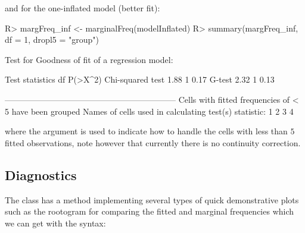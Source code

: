 \documentclass[
]{jss}
\newcommand{\1}{\mathcal{I}} \newcommand{\bZero}{\boldsymbol{0}}
\begin{document}
and for the one-inflated model (better fit):

\begin{CodeChunk}
\begin{CodeInput}
R> margFreq_inf <- marginalFreq(modelInflated)
R> summary(margFreq_inf, df = 1, dropl5 = "group")
\end{CodeInput}
\begin{CodeOutput}
Test for Goodness of fit of a regression model:

                 Test statistics df P(>X^2)
Chi-squared test            1.88  1    0.17
G-test                      2.32  1    0.13

-------------------------------------------------------------- 
Cells with fitted frequencies of < 5 have been grouped 
Names of cells used in calculating test(s) statistic: 1 2 3 4  
\end{CodeOutput}
\end{CodeChunk}

where the  argument is used to indicate how to handle the
cells with less than \(5\) fitted observations, note however that
currently there is no continuity correction.

\subsection{Diagnostics}\label{diagnostics}

The  class has a  method
implementing several types of quick demonstrative plots such as the
rootogram \citep[cf.][]{rootogram} for comparing the fitted and marginal
frequencies which we can get with the syntax:
\end{document}
